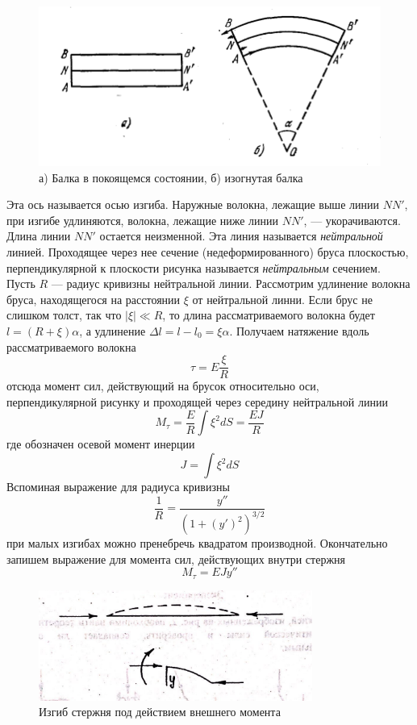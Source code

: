 \documentclass[a4paper,12pt]{article}
\begin{document}
\begin{figure}[H]\label{fig:izgib} 
    \centering
    \includegraphics[width = \textwidth]{Izgib.png}
    \caption{а) Балка в покоящемся состоянии, б) изогнутая балка}
\end{figure}
 Эта ось называется осью изгиба. Наружные волокна, лежащие выше
линии $NN'$, при изгибе удлиняются, волокна, лежащие ниже линии $NN
'$, — укорачиваются. Длина линии $NN'$ остается неизменной. Эта линия называется \textit{нейтральной} линией. Проходящее через нее сечение (недеформированного) бруса плоскостью, перпендикулярной к плоскости рисунка называется \textit{нейтральным} сечением. Пусть $R$ — радиус кривизны нейтральной линии. Рассмотрим удлинение волокна бруса, находящегося на расстоянии $\xi$ от нейтральной линни.  Если брус не слишком толст, так что $|\xi| \ll R$, то длина рассматриваемого волокна будет $l = (R + \xi) \alpha$, а удлинение $\Delta l = l - l_0 = \xi \alpha$. Получаем натяжение вдоль рассматриваемого волокна 
\[\tau = E \frac{\xi}{R}\]
отсюда момент сил, действующий на брусок относительно оси, перпендикулярной рисунку и проходящей через середину нейтральной линии
\[M_\tau = \frac{E}{R}\int \xi^2 dS = \frac{EJ}{R}\]
где обозначен осевой момент инерции
\[J = \int \xi^2 dS\]
Вспоминая выражение для радиуса кривизны
\[\frac{1}{R} = \frac{y''}{(1 + (y')^2)^{3 / 2}}\]
при малых изгибах можно пренебречь квадратом производной. Окончательно запишем выражение для момента сил, действующих внутри стержня
\[M_\tau = EJy''\]
\begin{figure}\label{fig: izgibMoment}
    \centering
    \includegraphics[width = 0.8\textwidth]{IzgibMoment.png}
    \caption{Изгиб стержня под действием внешнего момента}
\end{figure}
\end{document}
